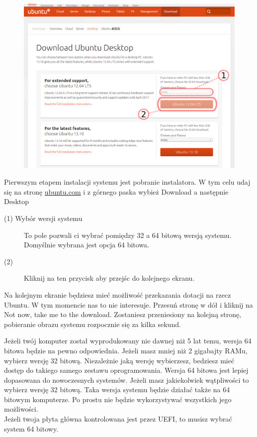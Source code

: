 \begin{figure}
	\includegraphics[scale=0.45]{images/instalacja_pobieranie_obrazu.png}
\end{figure}
Pierwszym etapem instalacji systemu jest pobranie instalatora. W tym celu udaj się na stronę \href{http://www.ubuntu.com/download/desktop}{ubuntu.com} i z górnego paska wybież \textcolor{ubuntu_orange}{Download} a następnie \textcolor{ubuntu_orange}{Desktop}
\begin{description}
\item[(1) Wybór wersji systemu]To pole pozwali ci wybrać pomiędzy 32 a 64 bitową wersją systemu. Domyślnie wybrana jest opcja 64 bitowa. 
\item[(2)]Kliknij na ten przycisk aby przejśc do kolejnego ekranu.
\end{description}
Na kolejnym ekranie będziesz mieć możliwość przekazania dotacji na rzecz Ubuntu. W tym momencie nas to nie interesuje. Przesuń stronę w dół i kliknij na \textcolor{ubuntu_orange}{Not now, take me to the download}. Zostaniesz przeniesiony na kolejną stronę, pobieranie obrazu systemu rozpocznie się za kilka sekund.

Jeżeli twój komputer został wyprodukowany nie dawnej niż 5 lat temu, wersja 64 bitowa będzie na pewno odpowiednia. Jeżeli masz mniej niż 2 gigabajty RAMu, wybierz wersję 32 bitową. Niezależnie jaką wersję wybierzesz, bedziesz mieć dostęp do takiego samego zestawu oprogramowania. Wersja 64 bitowa jest lepiej dopasowana do nowoczesnych systemów. Jeżeli masz jakiekolwiek wątpliwości to wybierz wersję 32 bitową. Taka wersja systemu będzie działać także na 64 bitowym komputerze. Po prostu nie będzie wykorzystywać wszystkich jego możliwości.\\
Jeżeli twoja płyta główna kontrolowana jest przez UEFI, to musisz wybrać system 64 bitowy.


